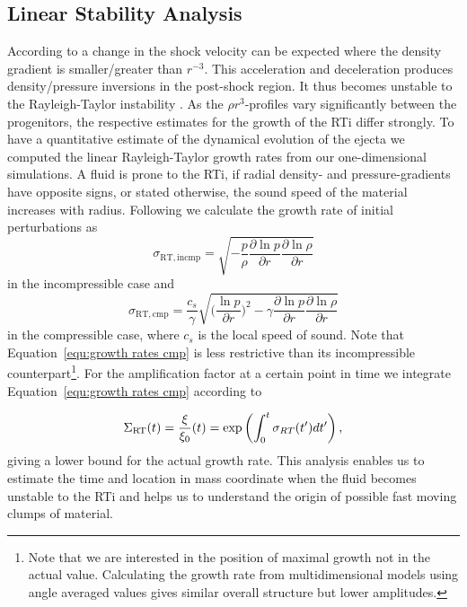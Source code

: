 \documentclass[fleqn,usenatbib]{mnras}
\begin{document}
\subsection{Linear Stability Analysis}
\label{sec:Linear Stability Analysis}
According to \cite{Sedov1961} a change in the shock velocity can be expected where the density gradient is smaller/greater than $r^{-3}$. This acceleration and deceleration produces density/pressure inversions in the post-shock region. It thus becomes unstable to the Rayleigh-Taylor instability \citep{Chevalier1978}. As the $\rho r^3 $-profiles vary significantly between the progenitors, the respective estimates for the growth of the RTi differ strongly.
To have a quantitative estimate of the dynamical evolution of the ejecta we computed the linear Rayleigh-Taylor growth rates from our one-dimensional simulations. A fluid is prone to the RTi, if radial density- and pressure-gradients have opposite signs, or stated otherwise, the sound speed of the material increases with radius. Following \cite{Mueller1991} we calculate the growth rate of initial perturbations as
\begin{equation}
  \label{equ:growth rates incmp}
  \sigma_{\mathrm{RT,incmp}} = \sqrt{- \frac{p}{\rho}\frac{\partial \ln p}{\partial r}\frac{\partial \ln \rho}{\partial r}}
\end{equation}
in the incompressible case and
\begin{equation}
  \sigma_{\mathrm{RT, cmp}} = \frac{c_{s}}{\gamma}\sqrt{\Big(\frac{\ln p}{\partial r}\Big)^ 2 - \gamma \frac{\partial \ln p}{\partial r}\frac{\partial \ln \rho}{\partial r}}\label{equ:growth rates cmp}
\end{equation}
in the compressible case, where $c_s$ is the local speed of sound. Note that Equation~\ref{equ:growth rates cmp} is less restrictive than its incompressible counterpart\footnote{Note that we are interested in the position of maximal growth not in the actual value. Calculating the growth rate from multidimensional models using angle averaged values gives similar overall structure but lower amplitudes.}. 
For the amplification factor at a certain point in time we integrate Equation~\ref{equ:growth rates cmp} according to

\begin{equation}
  \Sigma_{\rm RT}(t) = \frac{\xi}{\xi_0}(t) = \exp \left(\int_0^t \sigma_{RT} (t') dt' \right),\label{equ:growth rates int}
\end{equation}
giving a lower bound for the actual growth rate. This analysis enables us to estimate the time and location in mass coordinate when the fluid becomes unstable to the RTi and helps us to understand the origin of possible fast moving clumps of material.
\end{document}
